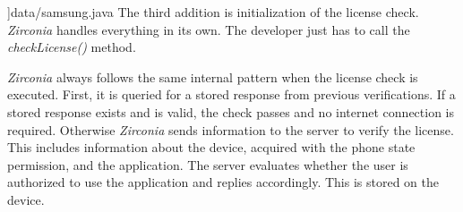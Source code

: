 ]{data/samsung.java}
The third addition is initialization of the license check.
\textit{Zirconia} handles everything in its own.
The developer just has to call the \textit{checkLicense()} method.
\newline

\textit{Zirconia} always follows the same internal pattern when the license check is executed.
First, it is queried for a stored response from previous verifications.
If a stored response exists and is valid, the check passes and no internet connection is required.
Otherwise \textit{Zirconia} sends information to the server to verify the license.
This includes information about the device, acquired with the phone state permission, and the application.
The server evaluates whether the user is authorized to use the application and replies accordingly.
This is stored on the device. \cite{samsungZirconia}
